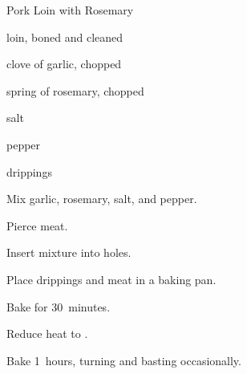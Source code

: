 \begin{recipe}{Pork Loin with Rosemary}{}{}

\begin{ingredients}
\item {}  loin, boned and cleaned
\item clove of garlic, chopped
\item spring of rosemary, chopped
\item salt
\item pepper
\item {} drippings
\end{ingredients}

\begin{directions}
\item Mix garlic, rosemary, salt, and pepper.
\item Pierce meat.
\item Insert mixture into holes.
\item Place drippings and meat in a baking pan.
\item Bake for 30~minutes.
\item Reduce heat to .
\item Bake 1\half~hours, turning and basting occasionally.
\end{directions}

\end{recipe}
